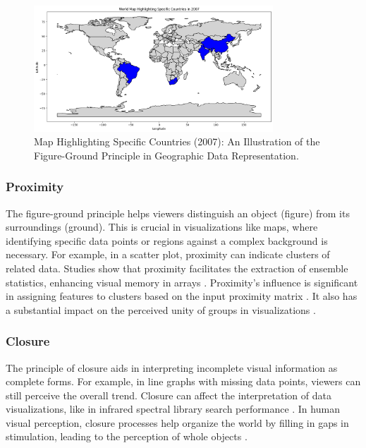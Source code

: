 \begin{figure}[h]
    \centering
\includegraphics[width=0.8\textwidth]{images/plots/lo2_world_map_highlight_countries_2007.png}
    \caption{Map Highlighting Specific Countries (2007): An Illustration of the Figure-Ground Principle in Geographic Data Representation.}
    \label{fig:lo2_map}
\end{figure}


\subsubsection{Proximity}

The figure-ground principle helps viewers distinguish an object (figure) from its surroundings (ground). This is crucial in visualizations like maps, where identifying specific data points or regions against a complex background is necessary. For example, in a scatter plot, proximity can indicate clusters of related data. Studies show that proximity facilitates the extraction of ensemble statistics, enhancing visual memory in arrays \cite{imMeanSizeUnit2014}. Proximity's influence is significant in assigning features to clusters based on the input proximity matrix \cite{scottFeatureGroupingRelocalisation1990}. It also has a substantial impact on the perceived unity of groups in visualizations \cite{promannEffectProximitySocial2018}.

\subsubsection{Closure}

The principle of closure aids in interpreting incomplete visual information as complete forms. For example, in line graphs with missing data points, viewers can still perceive the overall trend. Closure can affect the interpretation of data visualizations, like in infrared spectral library search performance \cite{harringtonClosureEffectsInfrared1987}. In human visual perception, closure processes help organize the world by filling in gaps in stimulation, leading to the perception of whole objects \cite{chenInvestigationClosureProcess1998}.

